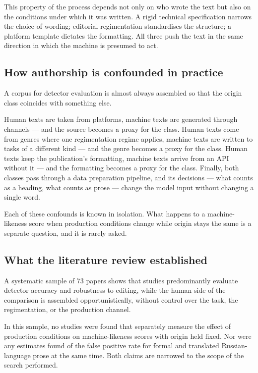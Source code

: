 \documentclass[11pt,a4paper]{article}
\renewcommand{\_}{\textunderscore\allowbreak}
\begin{document}
This property of the process depends not only on who wrote the text but also on the
conditions under which it was written. A rigid technical specification narrows the
choice of wording; editorial regimentation standardises the structure; a platform
template dictates the formatting. All three push the text in the same direction in
which the machine is presumed to act.

\subsection{How authorship is confounded in practice}

A corpus for detector evaluation is almost always assembled so that the origin class
coincides with something else.

Human texts are taken from platforms, machine texts are generated through channels —
and the source becomes a proxy for the class. Human texts come from genres where one
regimentation regime applies, machine texts are written to tasks of a different kind —
and the genre becomes a proxy for the class. Human texts keep the publication's
formatting, machine texts arrive from an API without it — and the formatting becomes
a proxy for the class. Finally, both classes pass through a data preparation
pipeline, and its decisions — what counts as a heading, what counts as
prose — change the model input without changing a single word.

Each of these confounds is known in isolation. What happens to a machine-likeness
score when production conditions change while origin stays the same is a separate
question, and it is rarely asked.

\subsection{What the literature review established}

A systematic sample of 73 papers shows that studies predominantly evaluate detector
accuracy and robustness to editing, while the human side of the comparison
is assembled opportunistically, without control over the task, the regimentation, or
the production channel.

In this sample, no studies were found that separately measure the effect of
production conditions on machine-likeness scores with origin held fixed. Nor were
any estimates found of the false positive rate for formal and translated
Russian-language prose at the same time. Both claims are narrowed to the scope of
the search performed.
\end{document}
